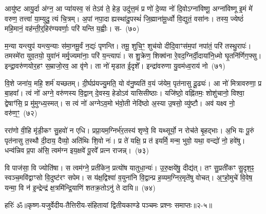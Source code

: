 {\anuvakamend[{वा आ॑र॒ण्याꣴश्चाव॑ रु॒न्धे\-ऽथो॑ प॒शुभिः॒ सो᳚\-ऽब्रवीद्दक्षिणा॒र्ध्य॑न्त्रय॑ इव ध्रु॒वा दे॒वाश्च॑त्वारि॒ꣳ॒शच्च॑}]}%

आयु॑ष्ट आयु॒र्दा अ॑ग्न॒ आ प्या॑यस्व॒ सं ते\-ऽव॑ ते॒ हेड॒ उदु॑त्त॒मं प्र णो॑ दे॒व्या नो॑ दि॒वो\-ऽग्ना॑विष्णू॒ अग्ना॑विष्णू इ॒मं मे॑ वरुण॒ तत्त्वा॑ या॒म्युदु॒ त्यं चि॒त्रम्। अ॒पां नपा॒दा ह्यस्था॑दु॒पस्थं॑ जि॒ह्माना॑मू॒र्ध्वो वि॒द्युतं॒ वसा॑नः। तस्य॒ ज्येष्ठं॑ महि॒मानं॒ वह॑न्ती॒र्॒\mbox{}हिर॑ण्यवर्णाः॒ परि॑ यन्ति य॒ह्वीः। स-~(७०)

म॒न्या यन्त्युप॑ यन्त्य॒न्याः स॑मा॒नमू॒र्वं न॒द्यः॑ पृणन्ति। तमू॒ शुचि॒ꣳ॒ शुच॑यो दीदि॒वाꣳस॑म॒पां नपा॑तं॒ परि॑ तस्थु॒रापः॑। तमस्मे॑रा युव॒तयो॒ युवा॑नं मर्मृ॒ज्यमा॑नाः॒ परि॑ य॒न्त्यापः॑। स शु॒क्रेण॒ शिक्व॑ना रे॒वद॒ग्निर्दी॒दाया॑नि॒ध्मो घृ॒तनि॑र्णिग॒फ्सु। इन्द्रा॒वरु॑णयोर॒हꣳ स॒म्राजो॒रव॒ आ वृ॑णे। ता नो॑ मृडात ई॒दृशे᳚। इन्द्रा॑वरुणा यु॒वम॑ध्व॒राय॑ नो~(७१)

वि॒शे जना॑य॒ महि॒ शर्म॑ यच्छतम्। दी॒र्घप्र॑यज्यु॒मति॒ यो व॑नु॒ष्यति॑ व॒यं ज॑येम॒ पृत॑नासु दू॒ढ्यः॑। आ नो॑ मित्रावरुणा॒ प्र बा॒हवा᳚। त्वं नो॑ अग्ने॒ वरु॑णस्य वि॒द्वान् दे॒वस्य॒ हेडो\-ऽव॑ यासिसीष्ठाः। यजि॑ष्ठो॒ वह्नि॑तमः॒ शोशु॑चानो॒ विश्वा॒ द्वेषाꣳ॑सि॒ प्र मु॑मुग्ध्य॒स्मत्। स त्वं नो॑ अग्ने\-ऽव॒मो भ॑वो॒ती नेदि॑ष्ठो अ॒स्या उ॒षसो॒ व्यु॑ष्टौ। अव॑ यक्ष्व नो॒ वरु॑ण॒ꣳ॒~(७२)

ररा॑णो वी॒हि मृ॑डी॒कꣳ सु॒हवो॑ न एधि। प्रप्रा॒यम॒ग्निर्भ॑र॒तस्य॑ शृण्वे॒ वि यथ्सूर्यो॒ न रोच॑ते बृ॒हद्भाः। अ॒भि यः पू॒रुं पृत॑नासु त॒स्थौ दी॒दाय॒ दैव्यो॒ अति॑थिः शि॒वो नः॑। प्र ते॑ यक्षि॒ प्र त॑ इयर्मि॒ मन्म॒ भुवो॒ यथा॒ वन्द्यो॑ नो॒ हवे॑षु। धन्व॑न्निव प्र॒पा अ॑सि॒ त्वम॑ग्न इय॒क्षवे॑ पू॒रवे᳚ प्रत्न राजन्न्।~(७३)

वि पाज॑सा॒ वि ज्योति॑षा। स त्वम॑ग्ने॒ प्रती॑केन॒ प्रत्यो॑ष यातुधा॒न्यः॑। उ॒रु॒क्षये॑षु॒ दीद्य॑त्। तꣳ सु॒प्रती॑कꣳ सु॒दृश॒ꣴ॒ स्वञ्च॒मवि॑द्वाꣳसो वि॒दुष्ट॑रꣳ सपेम। स य॑क्ष॒द्विश्वा॑ व॒युना॑नि वि॒द्वान्प्र ह॒व्यम॒ग्निर॒मृते॑षु वोचत्। अ॒ꣳ॒हो॒मुचे॑ वि॒वेष॒ यन्मा॒ वि न॑ इ॒न्द्रेन्द्र॑ क्ष॒त्रमि॑न्द्रि॒याणि॑ शतक्र॒तो\-ऽनु॑ ते दायि॥~(७४)

{\anuvakamend[{य॒ह्वीः सम॑ध्व॒राय॑ नो॒ वरु॑णꣳ राज॒ꣴ॒ श्चतु॑श्चत्वारिꣳशच्च}]}%

{हरिः॑ ॐ}{॥कृष्ण-यजुर्वेदीय-तैत्तिरीय-संहितायां द्वितीयकाण्डे पञ्चमः प्रश्नः समाप्तः॥२-५॥}

